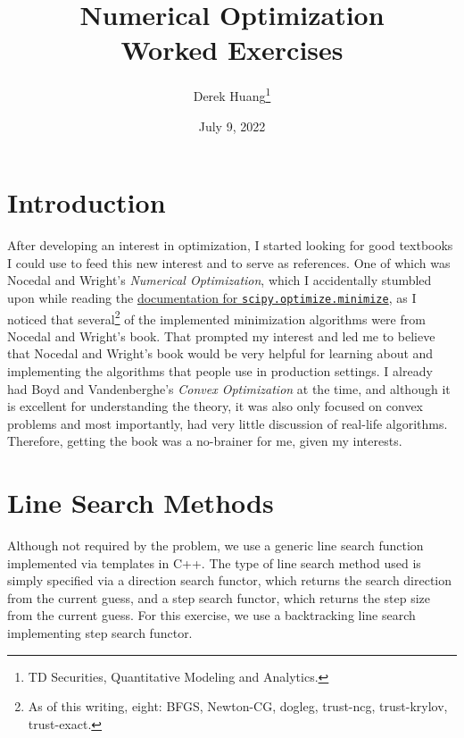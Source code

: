 \documentclass{article}
\title{Numerical Optimization \\ \Large Worked Exercises}
\author{%
    Derek Huang\thanks{TD Securities, Quantitative Modeling and Analytics.}
}
\date{July 9, 2022}
\begin{document}


\maketitle


\tableofcontents

\newpage

\section{Introduction}

After developing an interest in optimization, I started looking for good textbooks I could use to feed this new interest and to serve as references.
One of which was Nocedal and Wright's \textit{Numerical Optimization}, which
I accidentally stumbled upon while reading the
\href{%
    https://docs.scipy.org/doc/scipy/reference/generated/%
    scipy.optimize.minimize.html%
}{documentation for \texttt{scipy.optimize.minimize}}, as I noticed that
several\footnote{%
    As of this writing, eight: BFGS, Newton-CG, dogleg, trust-ncg,
    trust-krylov, trust-exact.%
}
of the implemented minimization algorithms were from Nocedal and Wright's
book. That prompted my interest and led me to believe that Nocedal and
Wright's book would be very helpful for learning about and implementing the
algorithms that people use in production settings. I already had Boyd and
Vandenberghe's \textit{Convex Optimization} at the time, and although it is
excellent for understanding the theory, it was also only focused on convex
problems and most importantly, had very little discussion of real-life
algorithms. Therefore, getting the book was a no-brainer for me, given my
interests.

\medskip



\section{Line Search Methods}


Although not required by the problem, we use a generic line search function
implemented via templates in C++. The type of line search method used is
simply specified via a direction search functor, which returns the search
direction from the current guess, and a step search functor, which returns the
step size from the current guess. For this exercise, we use a backtracking
line search implementing step search functor.
\end{document}

